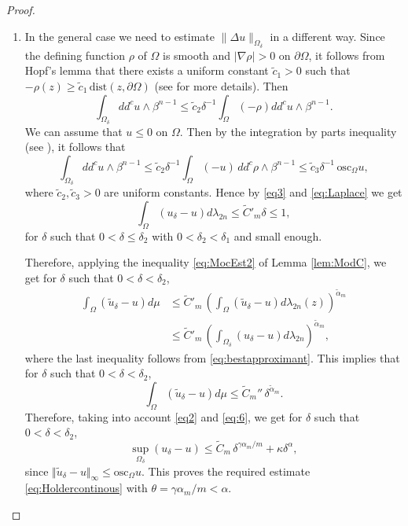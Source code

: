 \documentclass[JEP,XML,SOM,Unicode]{cedram}
\theoremstyle{definition}
\begin{document}
\begin{proof}
\begin{enumerate}
\item
In the general case we need to estimate $\|\Delta u\|_{\Omega_\delta}$ in a different way. Since the defining function $\rho$ of $\Omega$ is smooth and $\vert \nabla \rho \vert > 0$ on $\partial \Omega$, it follows from Hopf's lemma that there exists a uniform constant $\tilde c_1 > 0$ such that $- \rho (z) \geq \tilde c_1 \, \text{dist} (z, \partial \Omega)$ (see \cite{Ze20} for more details). Then
\[
\int_{\Omega_\delta} dd^c u \wedge \beta^{n-1} \leq \tilde c_2 \delta^{-1} \int_{\Omega} (- \rho) dd^c u \wedge \beta^{n-1}.
\]
We can assume that $u \leq 0$ on $\Omega$. Then by the integration by parts inequality (see \cite[(2.5)]{BZ20}), it follows that
\begin{equation} \label{eq:Laplace}
\int_{\Omega_\delta} dd^c u \wedge \beta^{n-1} \leq \tilde c_2 \delta^{-1} \int_{\Omega} (- u) \, dd^c \rho \wedge \beta^{n-1}\leq \tilde c_3 \delta^{-1} \, \text{osc}_{\Omega} u,
\end{equation}
where $\tilde c_2, \tilde c_3 > 0$ are uniform constants. Hence by \eqref{eq3} and \eqref{eq:Laplace} we get
\begin{equation*} \label{eq5}
\int_{\Omega}({u}_{\delta}-u)d\lambda_{2n} \leq {\tilde C}'_m \delta \leq 1,
\end{equation*}
for $\delta$ such that $0 < \delta \leq \delta_2$ with $0 < \delta_2 < \delta_1$ and small enough.

Therefore, applying the inequality \eqref{eq:MocEst2} of Lemma \ref{lem:ModC}, we get for $\delta$ such that $0 < \delta < \delta_2$,
\begin{align*}
\int_{\Omega}(\tilde{u}_{\delta}-u)d\mu & \leq \tilde C'_m \, \left(\int_{\Omega}(\tilde{u}_{\delta}-u) d\lambda_{2 n} (z)\right)^{\tilde \alpha_m} \\
&\leq \tilde C'_m \, \left(\int_{\Omega_{\delta}}({u}_{\delta}-u)d\lambda_{2 n} \right)^{\tilde \alpha_m},
\end{align*}
where the last inequality follows from \eqref{eq:bestapproximant}. This implies that for $\delta$ such that \hbox{$0\!<\!\delta\!<\!\delta_2$},
\begin{equation} \label{eq:6}
\int_{\Omega}(\tilde{u}_{\delta}-u)d\mu \leq \tilde C_m'' \, \delta^{\tilde \alpha_m}.
\end{equation}
Therefore, taking into account \eqref{eq2} and \eqref{eq:6}, we get for $\delta$ such that $0 < \delta < \delta_2$,
\[
\sup_{\Omega_{\delta}} ({u}_{\delta}-u) \leq \tilde C_m \, \delta^{\gamma\alpha_m \slash m} + \kappa \delta^{\alpha},
\]
since $\Vert \tilde u_{\delta} - u\Vert_{\infty}\!\leq\!\text{osc}_{\Omega} u$.
This proves the required estimate \eqref{eq:Holdercontinous} with \hbox{$\theta\!=\!\gamma\alpha_m/m\!<\!\alpha$}.\qedhere
\end{enumerate}
\end{proof}

\backmatter


\end{document}
